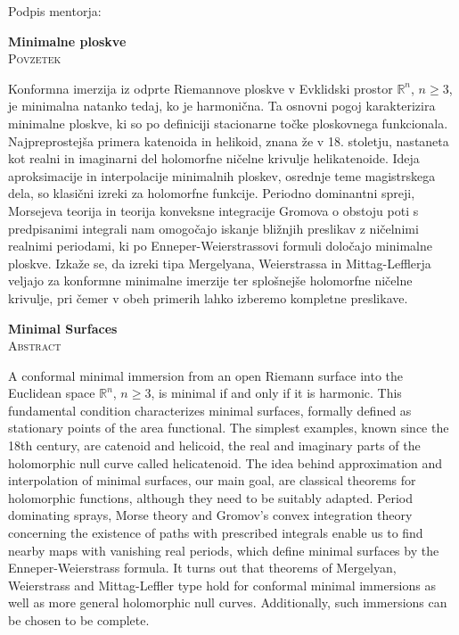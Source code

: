 \documentclass[12pt,a4paper,twoside]{article}
\newcommand{\naslovdela}{Minimalne ploskve}
\theoremstyle{definition} %
\theoremstyle{plain} %
\numberwithin{equation}{section}  %
\newcommand{\R}{\mathbb R}
\begin{document}
\vspace{2cm}
\hspace*{\fill} Podpis mentorja: \phantom{prostor za podpis}


\cleardoublepage
{}

\begin{center}
\textbf{\naslovdela} \\[3mm]
\textsc{Povzetek} \\[2mm]
\end{center}
Konformna imerzija iz odprte Riemannove ploskve v Evklidski prostor $\R^{n}$, $n \geq 3$, je minimalna natanko tedaj, ko je harmonična. Ta osnovni pogoj karakterizira minimalne ploskve, ki so po definiciji stacionarne točke ploskovnega funkcionala. Najpreprostejša primera katenoida in helikoid, znana že v 18. stoletju, nastaneta kot realni in imaginarni del holomorfne ničelne krivulje helikatenoide. Ideja aproksimacije in interpolacije minimalnih ploskev, osrednje teme magistrskega dela, so klasični izreki za holomorfne funkcije. Periodno dominantni spreji, Morsejeva teorija in teorija konveksne integracije Gromova o obstoju poti s predpisanimi integrali nam omogočajo iskanje bližnjih preslikav z ničelnimi realnimi periodami, ki po Enneper-Weierstrassovi formuli določajo minimalne ploskve. Izkaže se, da izreki tipa Mergelyana, Weierstrassa in Mittag-Lefflerja veljajo za konformne minimalne imerzije ter splošnejše holomorfne ničelne krivulje, pri čemer v obeh primerih lahko izberemo kompletne preslikave.

\vfill
\begin{center}
\textbf{Minimal Surfaces} \\[3mm] %
\textsc{Abstract}\\[2mm]
\end{center}
A conformal minimal immersion from an open Riemann surface into the Euclidean space $\R^{n}$, $n \geq 3$, is minimal if and only if it is harmonic. This fundamental condition characterizes minimal surfaces, formally defined as stationary points of the area functional. The simplest examples, known since the 18th century, are catenoid and helicoid, the real and imaginary parts of the holomorphic null curve called helicatenoid. The idea behind approximation and interpolation of minimal surfaces, our main goal, are classical theorems for holomorphic functions, although they need to be suitably adapted. Period dominating sprays, Morse theory and Gromov’s convex integration theory concerning the existence of paths with prescribed integrals enable us to find nearby maps with vanishing real periods, which define minimal surfaces by the Enneper-Weierstrass formula. It turns out that theorems of Mergelyan, Weierstrass and Mittag-Leffler type hold for conformal minimal immersions as well as more general holomorphic null curves. Additionally, such immersions can be chosen to be complete. 
\end{document}
